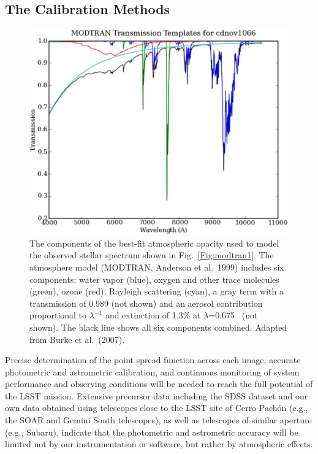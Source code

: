 \subsection{ The Calibration Methods }



\begin{figure}
\includegraphics[width=1.0\hsize,clip]{modtran2.pdf}
\caption{The components of the best-fit atmospheric opacity used to
model the observed stellar spectrum shown in Fig.~\ref{Fig:modtran1}.
The atmosphere model (MODTRAN, Anderson et al.~1999) includes six
components: water vapor (blue), oxygen and other trace molecules
(green), ozone (red), Rayleigh scattering (cyan), a gray term
with a transmission of 0.989 (not shown) and an aerosol contribution
proportional to $\lambda^{-1}$ and extinction of 1.3\% at $\lambda$=0.675 \mic\
(not shown). The black line shows all six components combined.
Adapted from Burke et al.~(2007).}
\label{Fig:modtran2}
\end{figure}


Precise determination of the point spread function across each image,
accurate photometric and astrometric calibration, and continuous monitoring
of system performance and observing conditions will be needed to reach the
full potential of the LSST mission. Extensive precursor data including the
SDSS dataset and our own data obtained using telescopes close to
the LSST site of Cerro Pach\'{o}n (e.g., the SOAR and Gemini South telescopes),
as well as telescopes of similar aperture (e.g., Subaru), indicate that the
photometric and astrometric accuracy will be limited not by our instrumentation
or software, but rather by atmospheric effects.

